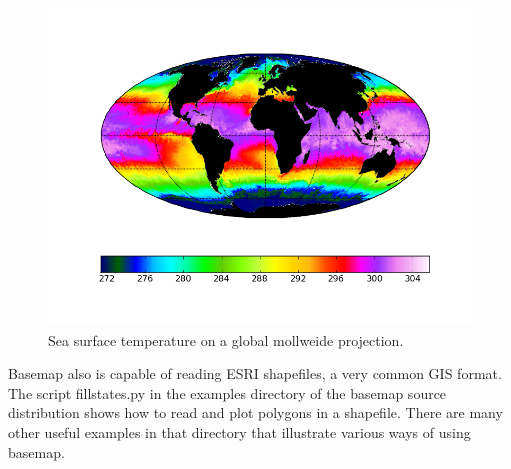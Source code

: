 \begin{figure}[h]
\includegraphics[scale=0.75]{fig/basemap5}

\caption{Sea surface temperature on a global mollweide projection.}

\end{figure}

\medskip{}

Basemap also is capable of reading ESRI shapefiles, a very common
GIS format. The script fillstates.py in the examples directory of
the basemap source distribution shows how to read and plot polygons
in a shapefile. There are many other useful examples in that directory
that illustrate various ways of using basemap.%
